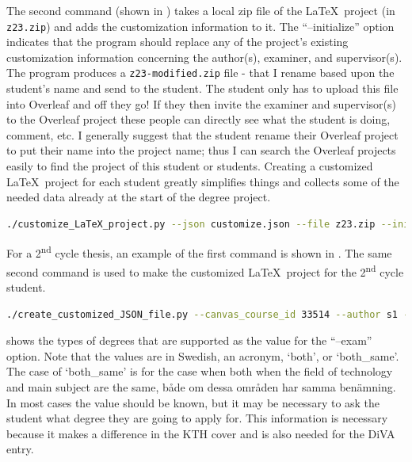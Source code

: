 The second command (shown in ) takes a local zip file of the \LaTeX~project (in \texttt{z23.zip}) and adds the customization information to it. The ``--initialize'' option indicates that the program should replace any of the project's existing customization information concerning the author(s), examiner, and supervisor(s). The program produces a \texttt{z23-modified.zip} file - that I rename based upon the student's name and send to the student. The student only has to upload this file into Overleaf and off they go! If they then invite the examiner and supervisor(s) to the Overleaf project these people can directly see what the student is doing, comment, etc. I generally suggest that the student rename their Overleaf project to put their name into the project name; thus I can search the Overleaf projects easily to find the project of this student or students. Creating a customized \LaTeX~project for each student greatly simplifies things and collects some of the needed data already at the start of the degree project.

\begin{lstlisting}[language={bash}, caption={Create a customized \LaTeX~project}, label=lst:customizeLaTeXproject]
./customize_LaTeX_project.py --json customize.json --file z23.zip --initialize
\end{lstlisting}

For a 2\textsuperscript{nd} cycle thesis, an example of the first command is shown in . The same second command is used to make the customized \LaTeX~project for the 2\textsuperscript{nd} cycle student.
\begin{lstlisting}[language={bash}, caption={Create a customized \LaTeX~project for a Master's student}, label=lst:createCustomizeJSONmasters]
./create_customized_JSON_file.py --canvas_course_id 33514 --author s1 --language eng --programCode TCSCM  --Examiner maguire --Supervisor vastberg   --Supervisor2 xxx  --courseCode DA231X  --exam master
\end{lstlisting}

 shows the types of degrees that are supported as the value for the ``--exam'' option. Note that the values are in Swedish, an acronym, `both', or `both\_same'. The case of `both\_same' is for the case when both when the field of technology and main subject are the same, \ie både om dessa områden har samma benämning. In most cases the value should be known, but it may be necessary to ask the student what degree they are going to apply for. This information is necessary because it makes a difference in the KTH cover and is also needed for the DiVA entry.

